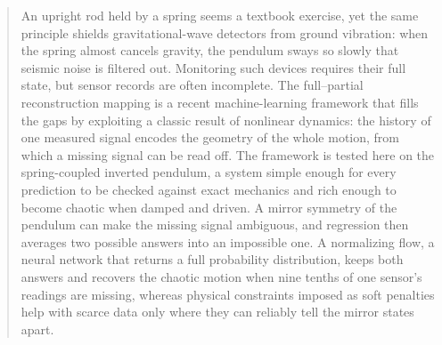 \begin{quotation}
An upright rod held by a spring seems a textbook exercise, yet the same principle shields gravitational-wave detectors from ground vibration: when the spring almost cancels gravity, the pendulum sways so slowly that seismic noise is filtered out. Monitoring such devices requires their full state, but sensor records are often incomplete. The full--partial reconstruction mapping is a recent machine-learning framework that fills the gaps by exploiting a classic result of nonlinear dynamics: the history of one measured signal encodes the geometry of the whole motion, from which a missing signal can be read off. The framework is tested here on the spring-coupled inverted pendulum, a system simple enough for every prediction to be checked against exact mechanics and rich enough to become chaotic when damped and driven. A mirror symmetry of the pendulum can make the missing signal ambiguous, and regression then averages two possible answers into an impossible one. A normalizing flow, a neural network that returns a full probability distribution, keeps both answers and recovers the chaotic motion when nine tenths of one sensor's readings are missing, whereas physical constraints imposed as soft penalties help with scarce data only where they can reliably tell the mirror states apart.
\end{quotation}
